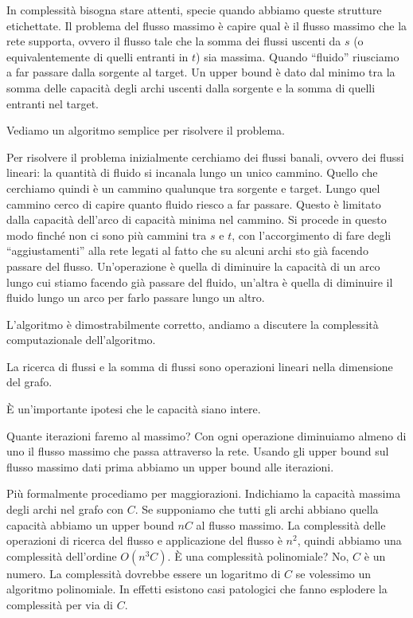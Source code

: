 In complessità bisogna stare attenti, specie quando abbiamo queste strutture etichettate. Il
problema del flusso massimo è capire qual è il flusso massimo che la rete supporta, ovvero il
flusso tale che la somma dei flussi uscenti da $s$ (o equivalentemente di quelli entranti in $t$)
sia massima. Quando ``fluido'' riusciamo a far passare dalla sorgente al target. Un upper bound è
dato dal minimo tra la somma delle capacità degli archi uscenti dalla sorgente e la somma di quelli
entranti nel target.

Vediamo un algoritmo semplice per risolvere il problema.

Per risolvere il problema inizialmente cerchiamo dei flussi banali, ovvero dei flussi lineari: la
quantità di fluido si incanala lungo un unico cammino. Quello che cerchiamo quindi è un cammino
qualunque tra sorgente e target. Lungo quel cammino cerco di capire quanto fluido riesco a far
passare. Questo è limitato dalla capacità dell'arco di capacità minima nel cammino. Si procede in
questo modo finché non ci sono più cammini tra $s$ e $t$, con l'accorgimento di fare degli
``aggiustamenti'' alla rete legati al fatto che su alcuni archi sto già facendo passare del flusso.
Un'operazione è quella di diminuire la capacità di un arco lungo cui stiamo facendo già passare
del fluido, un'altra è quella di diminuire il fluido lungo un arco per farlo passare lungo un
altro.

L'algoritmo è dimostrabilmente corretto, andiamo a discutere la complessità computazionale
dell'algoritmo.

La ricerca di flussi e la somma di flussi sono operazioni lineari nella dimensione del grafo.

È un'importante ipotesi che le capacità siano intere.

Quante iterazioni faremo al massimo? Con ogni operazione diminuiamo almeno di uno il flusso massimo
che passa attraverso la rete. Usando gli upper bound sul flusso massimo dati prima abbiamo un
upper bound alle iterazioni.

Più formalmente procediamo per maggiorazioni. Indichiamo la capacità massima degli archi nel grafo
con $C$. Se supponiamo che tutti gli archi abbiano quella capacità abbiamo un upper bound $nC$ al
flusso massimo. La complessità delle operazioni di ricerca del flusso e applicazione del flusso è
$n^{2}$, quindi abbiamo una complessità dell'ordine $O(n^{3}C)$. È una complessità polinomiale?
No, $C$ è un numero. La complessità dovrebbe essere un logaritmo di $C$ se volessimo un algoritmo
polinomiale. In effetti esistono casi patologici che fanno esplodere la complessità per via di $C$.

